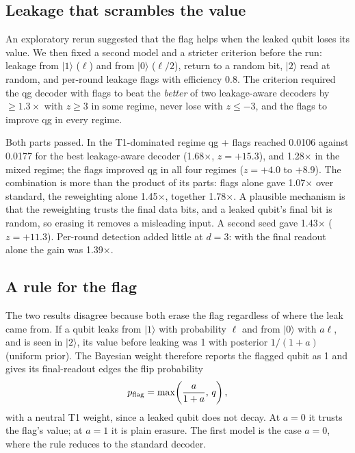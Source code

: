 \documentclass[11pt]{article}
\begin{document}
\subsection{Leakage that scrambles the value}

An exploratory rerun suggested that the flag helps when the leaked qubit loses its value. We then fixed
a second model and a stricter criterion before the run: leakage from $|1\rangle$ ($\ell$) and from
$|0\rangle$ ($\ell/2$), return to a random bit, $|2\rangle$ read at random, and per-round leakage
flags with efficiency 0.8. The criterion required the qg decoder with flags to beat the \emph{better}
of two leakage-aware decoders by $\ge1.3\times$ with $z\ge3$ in some regime, never lose with
$z\le-3$, and the flags to improve qg in every regime.

Both parts passed. In the T1-dominated regime qg + flags reached 0.0106 against 0.0177 for the best
leakage-aware decoder (1.68$\times$, $z=+15.3$), and 1.28$\times$ in the mixed regime; the flags
improved qg in all four regimes ($z=+4.0$ to $+8.9$). The combination is more than the product of its
parts: flags alone gave 1.07$\times$ over standard, the reweighting alone 1.45$\times$, together
1.78$\times$. A plausible mechanism is that the reweighting trusts the final data bits, and a
leaked qubit's final bit is random, so erasing it removes a misleading input. A second seed gave
1.43$\times$ ($z=+11.3$). Per-round detection added little at $d=3$: with the final readout alone the
gain was 1.39$\times$.

\subsection{A rule for the flag}\label{sec:bayes}

The two results disagree because both erase the flag regardless of where the leak came from. If a
qubit leaks from $|1\rangle$ with probability $\ell$ and from $|0\rangle$ with $a\ell$, and is seen in
$|2\rangle$, its value before leaking was 1 with posterior $1/(1+a)$ (uniform prior). The Bayesian weight
therefore reports the flagged qubit as 1 and gives its final-readout edges the flip probability
\begin{equation}\label{eq:pflag}
p_{\rm flag}=\max\!\left(\frac{a}{1+a},\,q\right),
\end{equation}
with a neutral T1 weight, since a leaked qubit does not decay. At $a=0$ it trusts the flag's value;
at $a=1$ it is plain erasure. The first model is the case $a=0$, where the rule reduces to the
standard decoder.
\end{document}
